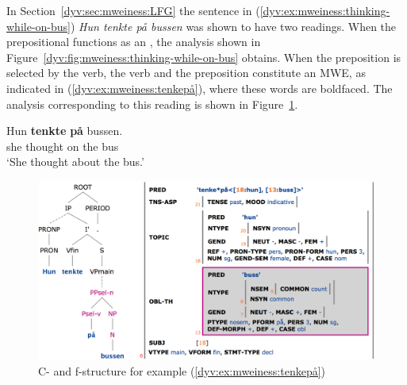 \documentclass[output=paper]{langsci/langscibook}
\begin{document}
In Section~\ref{dyv:sec:mweiness:LFG} the sentence in (\ref{dyv:ex:mweiness:thinking-while-on-bus}) \emph{Hun tenkte på bussen} was shown to have two readings.
When the prepositional  functions as an , the analysis shown in Figure~\ref{dyv:fig:mweiness:thinking-while-on-bus} obtains.
When the preposition is selected by the verb, the verb and the preposition constitute an MWE, as indicated in (\ref{dyv:ex:mweiness:tenkepå}), where these words are boldfaced.
The analysis corresponding to this reading is shown in Figure~\ref{dyv:fig:mweiness:selprepcons}.


\ea\label{dyv:ex:mweiness:tenkepå}
\gll Hun \textbf{tenkte} \textbf{på} bussen. \\
     she thought on {the bus}\\
\glt `She thought about the bus.'
\z


\begin{figure}
  \includegraphics[width=\textwidth]{figures/selprepcons.png}
  \caption{C- and f-structure for example (\ref{dyv:ex:mweiness:tenkepå})}
  \label{dyv:fig:mweiness:selprepcons}
\end{figure}
\end{document}
